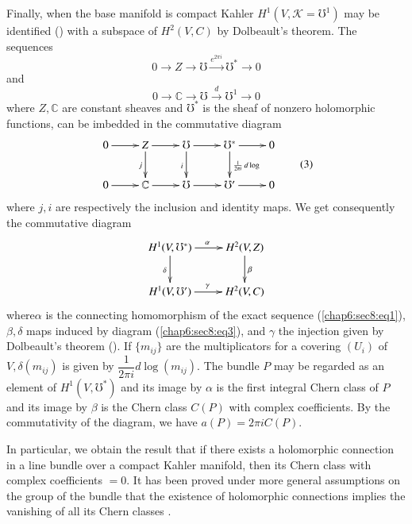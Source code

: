 Finally, when the base manifold is compact Kahler $H^1 (V, \mathcal{K}
= \mho^1)$ may be identified (\cite{30}) with a subspace of $H^2 (V, C)$
by Dolbeault's theorem. The sequences 
\begin{equation*}
  0 \to Z \to \mho \xrightarrow{e^{2 \pi i}} \mho^* \to 0
  \tag{1}\label{chap6:sec8:eq1} 
\end{equation*}
and
\begin{equation*}
  0 \to \mathbb{C} \to \mho \xrightarrow{d} \mho^1 \to 0
  \tag{2}\label{chap6:sec8:eq2}  
\end{equation*}
where $Z, \mathbb{C}$ are constant sheaves and $\mho^*$ is the sheaf
of nonzero holomorphic functions, can be imbedded in the commutative
diagram 
\[
\vcenter{\xymatrix@R=.3cm{0 \ar[r]& Z\ar[dd]_j\ar[r] & \mho \ar[dd]_i\ar[r]&
  \mho^\ast\ar[dd]^{\frac{1}{2 \pi i}\, d \log} \ar[r] & 0\\
  & & & &  \ar@{}[d]\\
0 \ar[r]& \mathbb{C} \ar[r] & \mho \ar[r] & \mho' \ar[r] & 0
}}\tag{3}\label{chap6:sec8:eq3}
\]
where $j, i$ are respectively the inclusion and identity maps. We get
consequently the commutative diagram 
\[
\xymatrix{H^1 (V, \mho^\ast)\ar[d]_\delta \ar[r]^\alpha &
  H^2(V,Z)\ar[d]^\beta\\
H^1 (V, \mho') \ar[r]^\gamma & H^2 (V, C)}
\]
where\pageoriginale $\alpha$ is the connecting homomorphism of the exact sequence
(\ref{chap6:sec8:eq1}), $\beta, \delta$ maps induced by diagram
(\ref{chap6:sec8:eq3}), and $\gamma$ the
injection given by Dolbeault's theorem (\cite{29}). If $\{m_{ij}\}$ are the
multiplicators for a covering $(U_i)$ of $V, \delta (m_{ij})$ is given
by $\dfrac{1}{2 \pi i} d \log (m_{ij})$. The bundle $P$ may be
regarded as an element of $H^1 (V, \mho^*)$ and its image by $\alpha$
is the first integral Chern class of $P$ and its image by $\beta$ is
the Chern class $C(P)$ with complex coefficients. By the commutativity
of the diagram, we have $a(P) = 2 \pi i C(P)$. 

In particular, we obtain the result that if there exists a holomorphic
connection in a line bundle over a compact Kahler manifold, then its
Chern class with complex coefficients $=0$. It has been proved under
more general assumptions on the group of the bundle that the existence
of holomorphic connections implies the vanishing of all its Chern
classes \cite{2}. 


